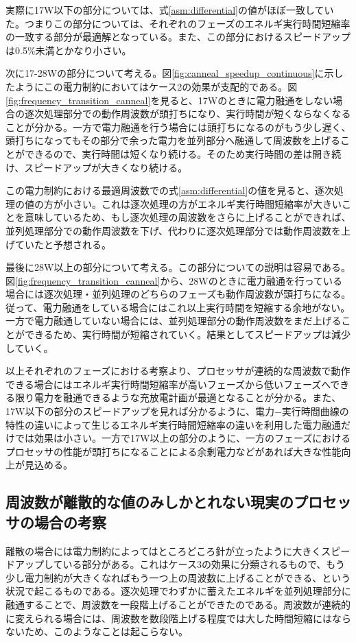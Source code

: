 実際に17W以下の部分については、式\ref{asm:differential}の値がほぼ一致していた。つまりこの部分については、それぞれのフェーズのエネルギ実行時間短縮率の一致する部分が最適解となっている。また、この部分におけるスピードアップは0.5\%未満とかなり小さい。

次に17-28Wの部分について考える。図\ref{fig:canneal_speedup_continuous}に示したようにこの電力制約においてはケース2の効果が支配的である。図\ref{fig:frequency_transition_canneal}を見ると、17Wのときに電力融通をしない場合の逐次処理部分での動作周波数が頭打ちになり、実行時間が短くならなくなることが分かる。一方で電力融通を行う場合には頭打ちになるのがもう少し遅く、頭打ちになってもその部分で余った電力を並列部分へ融通して周波数を上げることができるので、実行時間は短くなり続ける。そのため実行時間の差は開き続け、スピードアップが大きくなり続ける。

この電力制約における最適周波数での式\ref{asm:differential}の値を見ると、逐次処理の値の方が小さい。これは逐次処理の方がエネルギ実行時間短縮率が大きいことを意味しているため、もし逐次処理の周波数をさらに上げることができれば、並列処理部分での動作周波数を下げ、代わりに逐次処理部分では動作周波数を上げていたと予想される。

最後に28W以上の部分について考える。この部分についての説明は容易である。図\ref{fig:frequency_transition_canneal}から、28Wのときに電力融通を行っている場合には逐次処理・並列処理のどちらのフェーズも動作周波数が頭打ちになる。従って、電力融通をしている場合にはこれ以上実行時間を短縮する余地がない。一方で電力融通していない場合には、並列処理部分の動作周波数をまだ上げることができるため、実行時間が短縮されていく。結果としてスピードアップは減少していく。

以上それぞれのフェーズにおける考察より、プロセッサが連続的な周波数で動作できる場合にはエネルギ実行時間短縮率が高いフェーズから低いフェーズへできる限り電力を融通できるような充放電計画が最適となることが分かる。また、17W以下の部分のスピードアップを見れば分かるように、電力−実行時間曲線の特性の違いによって生じるエネルギ実行時間短縮率の違いを利用した電力融通だけでは効果は小さい。一方で17W以上の部分のように、一方のフェーズにおけるプロセッサの性能が頭打ちになることによる余剰電力などがあれば大きな性能向上が見込める。

\subsection{周波数が離散的な値のみしかとれない現実のプロセッサの場合の考察}
\label{subsec:discreet}

離散の場合には電力制約によってはところどころ針が立ったように大きくスピードアップしている部分がある。これはケース3の効果に分類されるもので、もう少し電力制約が大きくなればもう一つ上の周波数に上げることができる、という状況で起こるものである。逐次処理でわずかに蓄えたエネルギを並列処理部分に融通することで、周波数を一段階上げることができたのである。周波数が連続的に変えられる場合には、周波数を数段階上げる程度では大した時間短縮にはならないため、このようなことは起こらない。

